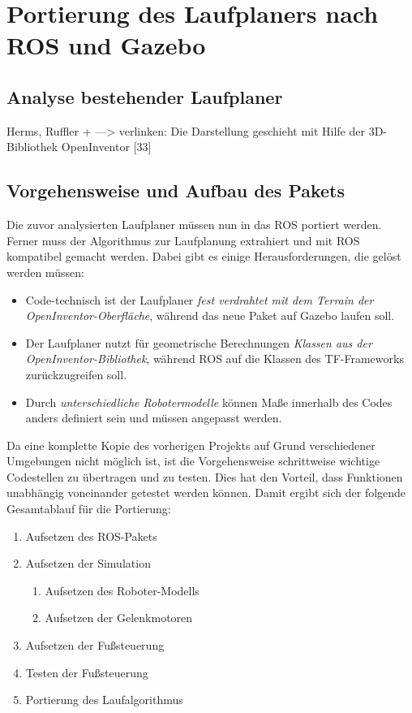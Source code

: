 \chapter{Portierung des Laufplaners nach ROS und Gazebo}

\section{Analyse bestehender Laufplaner}

Herms, Ruffler + ---> verlinken: Die Darstellung geschieht mit Hilfe der 3D- Bibliothek OpenInventor [33]

\section{Vorgehensweise und Aufbau des Pakets}

Die zuvor analysierten Laufplaner müssen nun in das \ac{ROS} portiert werden. Ferner muss der Algorithmus zur Laufplanung extrahiert und mit \ac{ROS} kompatibel gemacht werden. Dabei gibt es einige Herausforderungen, die gelöst werden müssen:
\begin{itemize}
  \item Code-technisch ist der Laufplaner \textit{fest verdrahtet mit dem Terrain der OpenInventor-Oberfläche}, während das neue Paket auf Gazebo laufen soll.
  \item Der Laufplaner nutzt für geometrische Berechnungen \textit{Klassen aus der OpenInventor-Bibliothek}, während \ac{ROS} auf die Klassen des TF-Frameworks zurückzugreifen soll.
  \item Durch \textit{unterschiedliche Robotermodelle} können Maße innerhalb des Codes anders definiert sein und müssen angepasst werden.
\end{itemize}

Da eine komplette Kopie des vorherigen Projekts auf Grund verschiedener Umgebungen nicht möglich ist, ist die Vorgehensweise schrittweise wichtige Codestellen zu übertragen und zu testen. Dies hat den Vorteil, dass Funktionen unabhängig voneinander getestet werden können. Damit ergibt sich der folgende Gesamtablauf für die Portierung:
\begin{enumerate}
  \item Aufsetzen des \ac{ROS}-Pakets
  \item Aufsetzen der Simulation
  \begin{enumerate}
    \item Aufsetzen des Roboter-Modells
    \item Aufsetzen der Gelenkmotoren
  \end{enumerate}
  \item Aufsetzen der Fußsteuerung
  \item Testen der Fußsteuerung
  \item Portierung des Laufalgorithmus
\end{enumerate}

